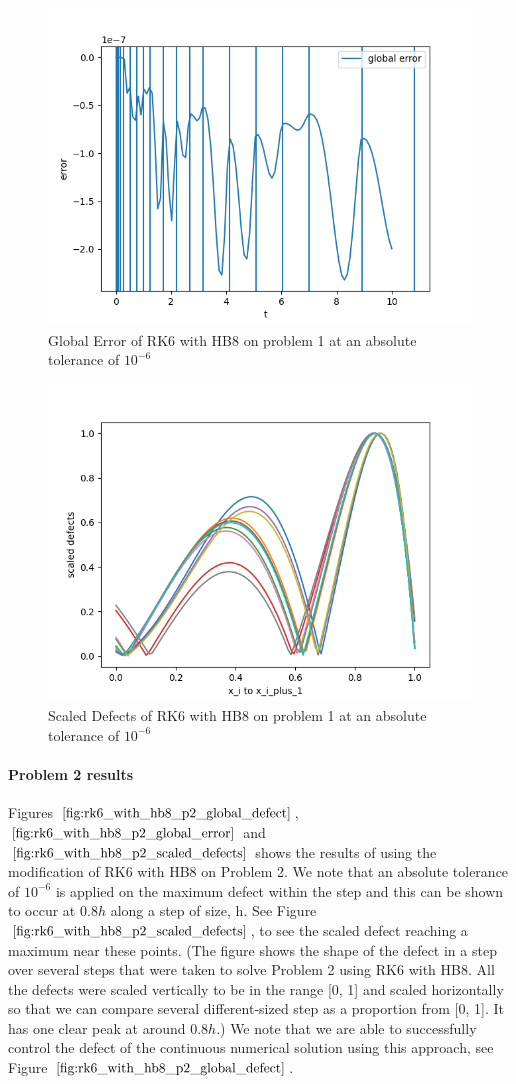 \documentclass{article}
\begin{document}
\begin{figure}[H]
\centering
\includegraphics[width=0.7\linewidth]{./figures/rk6_with_hb8_p1_global_error}
\caption{Global Error of RK6 with HB8 on problem 1 at an absolute tolerance of $10^{-6}$}
\label{fig:rk6_with_hb8_p1_global_error}
\end{figure}

\begin{figure}[H]
\centering
\includegraphics[width=0.7\linewidth]{./figures/rk6_with_hb8_p1_scaled_defects}
\caption{Scaled Defects of RK6 with HB8 on problem 1 at an absolute tolerance of $10^{-6}$}
\label{fig:rk6_with_hb8_p1_scaled_defects}
\end{figure}

\paragraph{Problem 2 results}
Figures $\ref{fig:rk6_with_hb8_p2_global_defect}$, $\ref{fig:rk6_with_hb8_p2_global_error}$ and $\ref{fig:rk6_with_hb8_p2_scaled_defects}$ shows the results of using the modification of RK6 with HB8 on Problem 2. We note that an absolute tolerance of $10^{-6}$ is applied on the maximum defect within the step and this can be shown to occur at $0.8h$ along a step of size, h. See Figure $\ref{fig:rk6_with_hb8_p2_scaled_defects}$, to see the scaled defect reaching a maximum near these points. (The figure shows the shape of the defect in a step over several steps that were taken to solve Problem 2 using RK6 with HB8. All the defects were scaled vertically to be in the range [0, 1] and scaled horizontally so that we can compare several different-sized step as a proportion from [0, 1]. It has one clear peak at around $0.8h$.) We note that we are able to successfully control the defect of the continuous numerical solution using this approach, see Figure $\ref{fig:rk6_with_hb8_p2_global_defect}$. 
\end{document}
